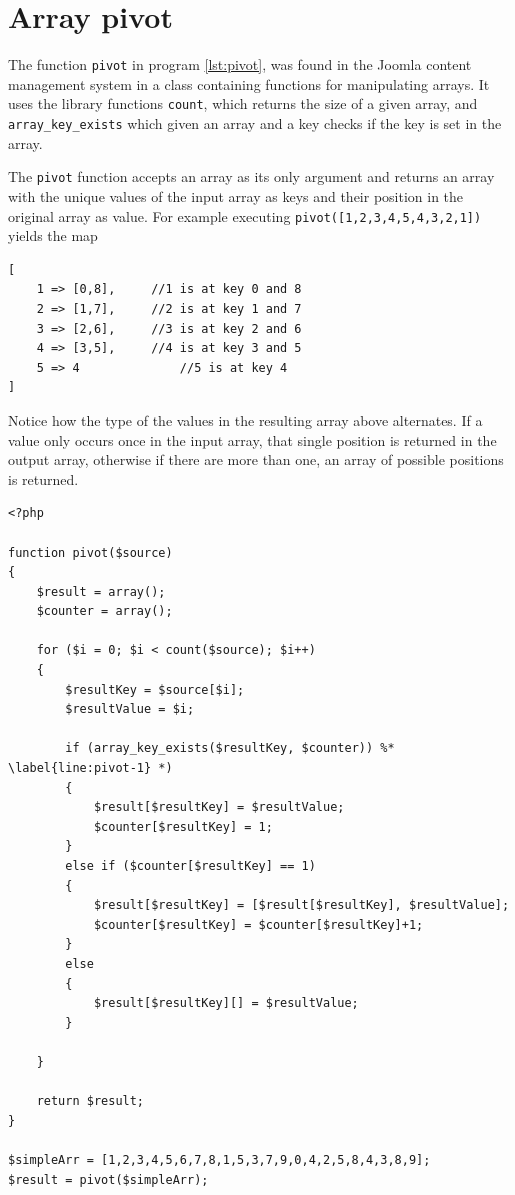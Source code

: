 \section{Array pivot}
\label{sec:arraypivot}
The function \texttt{pivot} in program \ref{lst:pivot}, was found in the Joomla content management system in a class containing functions for manipulating arrays. It uses the library functions \texttt{count}, which returns the size of a given array, and \texttt{array\_key\_exists} which given an array and a key checks if the key is set in the array. 

The \texttt{pivot} function accepts an array as its only argument and returns an array with the unique values of the input array as keys and their position in the original array as value. For example executing \texttt{pivot([1,2,3,4,5,4,3,2,1])} yields the map
\begin{lstlisting}[style=nonumbers]
[
	1 => [0,8], 	//1 is at key 0 and 8
	2 => [1,7], 	//2 is at key 1 and 7
	3 => [2,6], 	//3 is at key 2 and 6
	4 => [3,5], 	//4 is at key 3 and 5
	5 => 4  			//5 is at key 4
]
\end{lstlisting}
Notice how the type of the values in the resulting array above alternates. If a value only occurs once in the input array, that single position is returned in the output array, otherwise if there are more than one, an array of possible positions is returned.
\begin{program}
\begin{lstlisting}
<?php

function pivot($source)
{
    $result = array();
    $counter = array();

    for ($i = 0; $i < count($source); $i++)
    {
        $resultKey = $source[$i];
        $resultValue = $i;

        if (array_key_exists($resultKey, $counter)) %* \label{line:pivot-1} *)
        {
            $result[$resultKey] = $resultValue;
            $counter[$resultKey] = 1;
        }
        else if ($counter[$resultKey] == 1)
        {
            $result[$resultKey] = [$result[$resultKey], $resultValue];
            $counter[$resultKey] = $counter[$resultKey]+1;
        }
        else
        {
            $result[$resultKey][] = $resultValue;
        }

    }

    return $result;
}

$simpleArr = [1,2,3,4,5,6,7,8,1,5,3,7,9,0,4,2,5,8,4,3,8,9];
$result = pivot($simpleArr);
\end{lstlisting}
\caption{Pivot example}
\label{lst:pivot}
\end{program}
